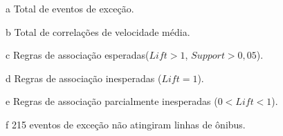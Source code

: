 \documentclass[
	12pt,				%
	oneside,			%
	a4paper,			%
	english,			%
	brazil				%
	]{abntex2ppgsi}
\begin{document}
{{\begin{apendicesenv}
\begin{table}[!htb]
\begin{threeparttable}
\begin{tablenotes}
            \item[a] Total de eventos de exceção.
            \item[b] Total de correlações de velocidade média.
            \item[c] Regras de associação esperadas($Lift > 1$, $Support > 0,05$).
            \item[d] Regras de associação inesperadas ($Lift = 1$).
            \item[e] Regras de associação parcialmente inesperadas ($0 < Lift < 1$).
            \item[f] 215 eventos de exceção não atingiram linhas de ônibus.
        \end{tablenotes}
\end{threeparttable}
\end{table}


\end{apendicesenv}}}
\end{document}
